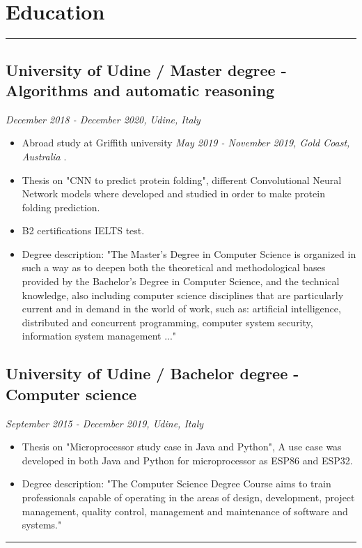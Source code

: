 \documentclass[a4paper,10pt]{article}
\begin{document}
\begin{minipage}[t]{0.25\textwidth}
        \section*{Education}
    \vspace{7.2cm} %
    \rule{0.6cm}{0.3mm}
\end{minipage}
\hfill
\begin{minipage}[t]{0.75\textwidth}
     \subsection*{University of Udine / Master degree - Algorithms and automatic reasoning }
    \textit{December 2018 - December 2020, Udine, Italy} \\
    \begin{itemize}[leftmargin=1cm]
        \item Abroad study at Griffith university \textit{May 2019 - November 2019, Gold Coast, Australia} .
        \item Thesis on  "CNN to predict protein folding", different Convolutional Neural Network models where developed and studied in order to make protein folding prediction.
        \item B2 certifications IELTS test.
         \item Degree description: "The Master's Degree in Computer Science is organized in such a way as to deepen both the theoretical and methodological bases provided by the Bachelor's Degree in Computer Science, and the technical knowledge, also including computer science disciplines that are particularly current and in demand in the world of work, such as: artificial intelligence, distributed and concurrent programming, computer system security, information system management ..."
    \end{itemize}

    \subsection*{University of Udine / Bachelor degree - Computer science }
    \textit{September 2015 - December 2019, Udine, Italy} \\
        \begin{itemize}[leftmargin=1cm]
        \item Thesis on  "Microprocessor study case in Java and Python", A use case was developed in both Java and Python for microprocessor as ESP86 and ESP32.
        \item Degree description: "The Computer Science Degree Course aims to train professionals capable of operating in the areas of design, development, project management, quality control, management and maintenance of software and systems."
    \end{itemize}
    \rule{\linewidth}{0.5mm}
\end{minipage}
\end{document}

